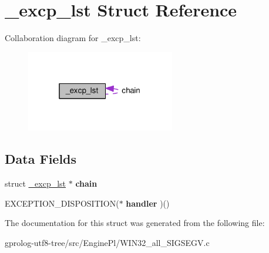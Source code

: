 \hypertarget{struct__excp__lst}{}\section{\+\_\+excp\+\_\+lst Struct Reference}
\label{struct__excp__lst}


Collaboration diagram for \+\_\+excp\+\_\+lst\+:\nopagebreak
\begin{figure}[H]
\begin{center}
\leavevmode
\includegraphics[width=184pt]{struct__excp__lst__coll__graph}
\end{center}
\end{figure}
\subsection*{Data Fields}
\begin{DoxyCompactItemize}
\item 
struct \hyperlink{struct__excp__lst}{\+\_\+excp\+\_\+lst} $\ast$ {\bfseries chain}\hypertarget{struct__excp__lst_af3aa96f46675863a93c104985a99b44f}{}\label{struct__excp__lst_af3aa96f46675863a93c104985a99b44f}

\item 
E\+X\+C\+E\+P\+T\+I\+O\+N\+\_\+\+D\+I\+S\+P\+O\+S\+I\+T\+I\+ON($\ast$ {\bfseries handler} )()\hypertarget{struct__excp__lst_a1e1e0c071255497025a22a693efc487c}{}\label{struct__excp__lst_a1e1e0c071255497025a22a693efc487c}

\end{DoxyCompactItemize}


The documentation for this struct was generated from the following file\+:\begin{DoxyCompactItemize}
\item 
gprolog-\/utf8-\/tree/src/\+Engine\+Pl/W\+I\+N32\+\_\+all\+\_\+\+S\+I\+G\+S\+E\+G\+V.\+c\end{DoxyCompactItemize}
